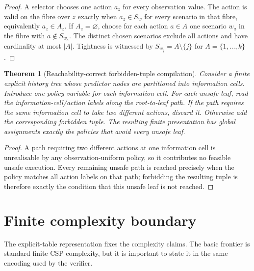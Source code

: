 \documentclass[11pt]{article}
\theoremstyle{plain}
\newtheorem{theorem}{Theorem}[section]
\theoremstyle{definition}
\theoremstyle{remark}
\begin{document}
\begin{proof}
A selector chooses one action \(a_z\) for every observation value.  The action is
valid on the fibre over \(z\) exactly when \(a_z\in S_w\) for every scenario in
that fibre, equivalently \(a_z\in A_z\).  If \(A_z=\varnothing\), choose for each
action \(a\in A\) one scenario \(w_a\) in the fibre with \(a\notin S_{w_a}\).
The distinct chosen scenarios exclude all actions and have cardinality at most
\(|A|\).  Tightness is witnessed by \(S_{w_j}=A\setminus\{j\}\) for
\(A=\{1,\ldots,k\}\).
\end{proof}

\begin{theorem}[Reachability-correct forbidden-tuple compilation]
Consider a finite explicit history tree whose predictor nodes are partitioned
into information cells.  Introduce one policy variable for each information
cell.  For each unsafe leaf, read the information-cell/action labels along the
root-to-leaf path.  If the path requires the same information cell to take two
different actions, discard it.  Otherwise add the corresponding forbidden tuple.
The resulting finite presentation has global assignments exactly the policies
that avoid every unsafe leaf.
\end{theorem}

\begin{proof}
A path requiring two different actions at one information cell is unrealisable
by any observation-uniform policy, so it contributes no feasible unsafe
execution.  Every remaining unsafe path is reached precisely when the policy
matches all action labels on that path; forbidding the resulting tuple is
therefore exactly the condition that this unsafe leaf is not reached.
\end{proof}

\section{Finite complexity boundary}
\label{sec:complexity}

The explicit-table representation fixes the complexity claims.  The basic
frontier is standard finite CSP complexity, but it is important to state it in
the same encoding used by the verifier.
\end{document}
